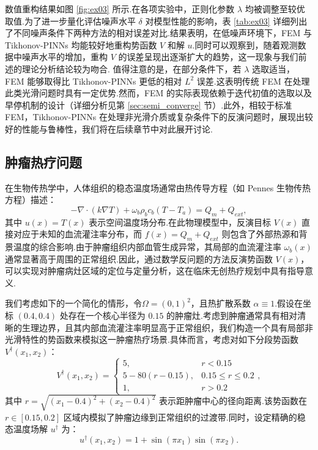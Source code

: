 数值重构结果如图 \ref{fig:ex03} 所示.在各项实验中，正则化参数 $\lambda$ 均被调整至较优取值.为了进一步量化评估噪声水平 $\delta$ 对模型性能的影响，表 \ref{tab:ex03} 详细列出了不同噪声条件下两种方法的相对误差对比.结果表明，在低噪声环境下，FEM 与 Tikhonov-PINNs 均能较好地重构势函数 $V$ 和解 $u$.同时可以观察到，随着观测数据中噪声水平的增加，重构 $V$ 的误差呈现出逐渐扩大的趋势，这一现象与我们前述的理论分析结论较为吻合.
值得注意的是，在部分条件下，若 $\lambda$ 选取适当，FEM 能够取得比 Tikhonov-PINNs 更低的相对 $L^2$ 误差.这表明传统 FEM 在处理此类光滑问题时具有一定优势.然而，FEM 的实际表现依赖于迭代初值的选取以及早停机制的设计（详细分析见第 \ref{sec:semi_converge} 节）.此外，相较于标准 FEM，Tikhonov-PINNs 在处理非光滑介质或复杂条件下的反演问题时，展现出较好的性能与鲁棒性，我们将在后续章节中对此展开讨论.

\subsection{肿瘤热疗问题}
在生物传热学中，人体组织的稳态温度场通常由热传导方程（如 Pennes 生物传热方程）描述：
$$-\nabla \cdot (k \nabla T) + \omega_b \rho_b c_b (T-T_a) =  Q_m + Q_{ext},$$
其中 $u(x) = T(x)$ 表示空间温度场分布.在此物理模型中，反演目标 $V(x)$ 直接对应于未知的血流灌注率分布，而 $f(x)=Q_m + Q_{ext}$ 则包含了外部热源和背景温度的综合影响.由于肿瘤组织内部血管生成异常，其局部的血流灌注率 $\omega_b(x)$ 通常显著高于周围的正常组织.因此，通过数学反问题的方法反演势函数 $V(x)$，可以实现对肿瘤病灶区域的定位与定量分析，这在临床无创热疗规划中具有指导意义.

\begin{example}\label{example:ex05}
我们考虑如下的一个简化的情形，令$\Omega=(0,1)^{2}$，且热扩散系数 $\alpha\equiv 1$.假设在坐标 $(0.4, 0.4)$ 处存在一个核心半径为 $0.15$ 的肿瘤灶.考虑到肿瘤通常具有相对清晰的生理边界，且其内部血流灌注率明显高于正常组织，我们构造一个具有局部非光滑特性的势函数来模拟这一肿瘤热疗场景.具体而言，考虑对如下分段势函数 $V^{\dagger}(x_{1},x_{2})$：
$$V^{\dagger}(x_{1},x_{2}) =
\begin{cases}
5, & r < 0.15 \\
5 - 80(r - 0.15), & 0.15 \le r \le 0.2 \\
1, & r > 0.2
\end{cases},$$
其中 $r = \sqrt{(x_1-0.4)^2+(x_2-0.4)^2}$ 表示距肿瘤中心的径向距离.该势函数在 $r \in [0.15, 0.2]$ 区域内模拟了肿瘤边缘到正常组织的过渡带.同时，设定精确的稳态温度场解 $u^{\dagger}$ 为：
\[
u^{\dagger}(x_{1},x_{2})=1+\sin(\pi x_{1})\sin(\pi x_{2}).
\]
\end{example}

